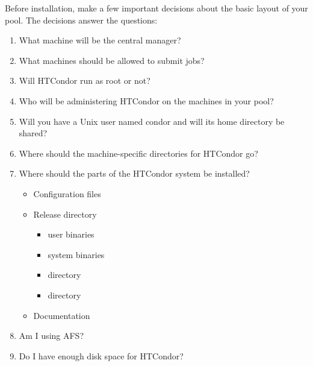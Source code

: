 Before installation, make a few important
decisions about the basic layout of your pool.
The decisions answer the questions:

\begin{enumerate}
\item What machine will be the central manager?
\item What machines should be allowed to submit jobs?
\item Will HTCondor run as root or not?
\item Who will be administering HTCondor on the machines in your pool?
\item Will you have a Unix user named condor and will its home directory be
   shared? 
\item Where should the machine-specific directories for HTCondor go?
\item Where should the parts of the HTCondor system be installed? 
	\begin{itemize}
	\item Configuration files
	\item Release directory
		\begin{itemize}
		\item user binaries
		\item system binaries 
		\item {} directory
	  	\item {} directory
		\end{itemize}
	\item Documentation
	\end{itemize}
\item Am I using AFS?
\item Do I have enough disk space for HTCondor?
\end{enumerate}

